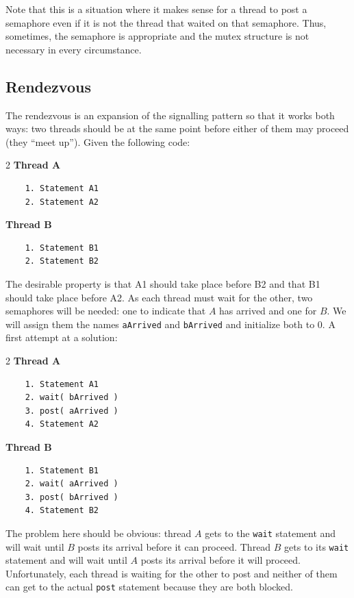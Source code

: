 Note that this is a situation where it makes sense for a thread to post a semaphore even if it is not the thread that waited on that semaphore. Thus, sometimes, the semaphore is appropriate and the mutex structure is not necessary in every circumstance.
\newpage
\subsection*{Rendezvous}
The rendezvous is an expansion of the signalling pattern so that it works both ways: two threads should be at the same point before either of them may proceed (they ``meet up''). Given the following code:

\begin{multicols}{2}
	\textbf{Thread A}\vspace{-2em}
	\begin{verbatim}
	1. Statement A1
	2. Statement A2
  	\end{verbatim}
	\columnbreak
	\textbf{Thread B}\vspace{-2em}
	\begin{verbatim}
	1. Statement B1
	2. Statement B2
  \end{verbatim}
\end{multicols}
\vspace{-2em}

The desirable property is that A1 should take place before B2 and that B1 should take place before A2. As each thread must wait for the other, two semaphores will be needed: one to indicate that $A$ has arrived and one for $B$. We will assign them the names \texttt{aArrived} and \texttt{bArrived} and initialize both to 0. A first attempt at a solution:

\begin{multicols}{2}
	\textbf{Thread A}\vspace{-2em}
	\begin{verbatim}
	1. Statement A1
	2. wait( bArrived )
	3. post( aArrived )
	4. Statement A2
  \end{verbatim}
	\columnbreak
	\textbf{Thread B}\vspace{-2em}
	\begin{verbatim}
	1. Statement B1
	2. wait( aArrived )
	3. post( bArrived )
	4. Statement B2
  \end{verbatim}
\end{multicols}
\vspace{-2em}


The problem here should be obvious: thread $A$ gets to the \texttt{wait} statement and will wait until $B$ posts its arrival before it can proceed. Thread $B$ gets to its \texttt{wait} statement and will wait until $A$ posts its arrival before it will proceed. Unfortunately, each thread is waiting for the other to post and neither of them can get to the actual \texttt{post} statement because they are both blocked.

